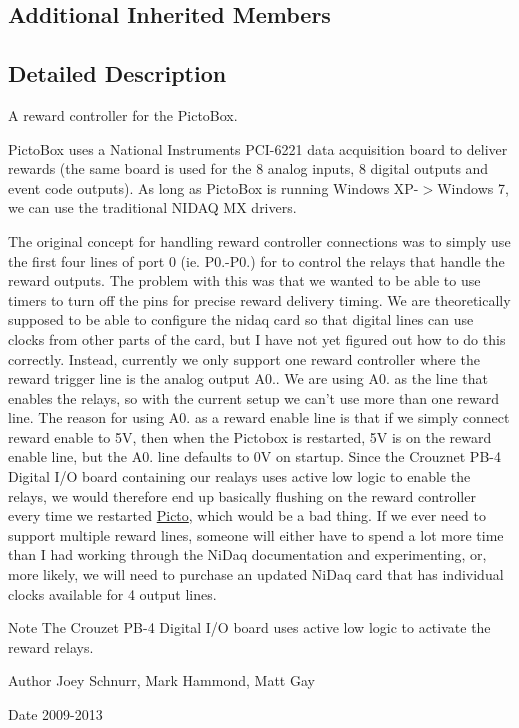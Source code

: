 \subsection*{Additional Inherited Members}


\subsection{Detailed Description}
A reward controller for the Picto\-Box. 

Picto\-Box uses a National Instruments P\-C\-I-\/6221 data acquisition board to deliver rewards (the same board is used for the 8 analog inputs, 8 digital outputs and event code outputs). As long as Picto\-Box is running Windows X\-P-\/$>$Windows 7, we can use the traditional N\-I\-D\-A\-Q M\-X drivers.

The original concept for handling reward controller connections was to simply use the first four lines of port 0 (ie. P0.-\/\-P0.) for to control the relays that handle the reward outputs. The problem with this was that we wanted to be able to use timers to turn off the pins for precise reward delivery timing. We are theoretically supposed to be able to configure the nidaq card so that digital lines can use clocks from other parts of the card, but I have not yet figured out how to do this correctly. Instead, currently we only support one reward controller where the reward trigger line is the analog output A0.. We are using A0. as the line that enables the relays, so with the current setup we can't use more than one reward line. The reason for using A0. as a reward enable line is that if we simply connect reward enable to 5\-V, then when the Pictobox is restarted, 5\-V is on the reward enable line, but the A0. line defaults to 0\-V on startup. Since the Crouznet P\-B-\/4 Digital I/\-O board containing our realays uses active low logic to enable the relays, we would therefore end up basically flushing on the reward controller every time we restarted \hyperlink{namespace_picto}{Picto}, which would be a bad thing. If we ever need to support multiple reward lines, someone will either have to spend a lot more time than I had working through the Ni\-Daq documentation and experimenting, or, more likely, we will need to purchase an updated Ni\-Daq card that has individual clocks available for 4 output lines.

\begin{DoxyNote}{Note}
The Crouzet P\-B-\/4 Digital I/\-O board uses active low logic to activate the reward relays. 
\end{DoxyNote}
\begin{DoxyAuthor}{Author}
Joey Schnurr, Mark Hammond, Matt Gay 
\end{DoxyAuthor}
\begin{DoxyDate}{Date}
2009-\/2013 
\end{DoxyDate}



